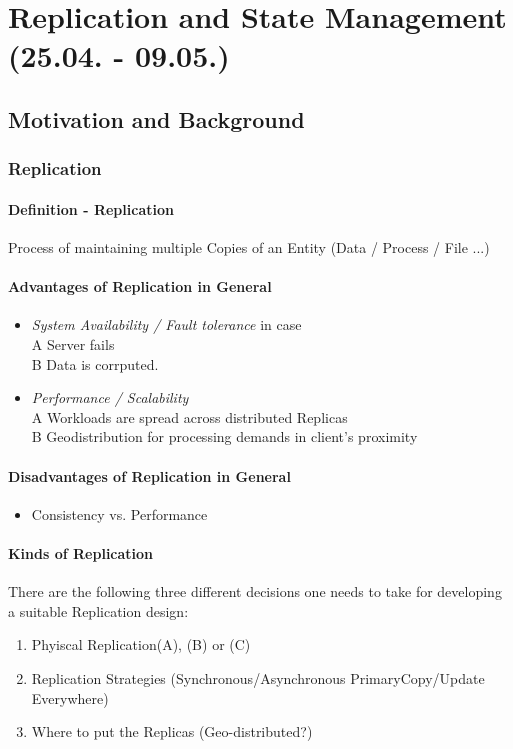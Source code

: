 \documentclass[a4paper,12pt]{article}%
\begin{document}
 \section{Replication and State Management\\ (25.04. - 09.05.)}


\subsection{Motivation and Background}

\subsubsection{Replication}
\paragraph{Definition - Replication}
Process of maintaining multiple Copies of an Entity (Data / Process / File ...)

\paragraph{Advantages of Replication in General}
\begin{itemize}
	\item {\it System Availability / Fault tolerance} in case \\
	A \quad Server fails \\
	B \quad Data is corrputed.
	\item {\it Performance / Scalability } \\
	A \quad Workloads are spread across distributed Replicas \\
	B \quad Geodistribution for processing demands in client's proximity
\end{itemize} 

\paragraph{Disadvantages of Replication in General}
\begin{itemize}
	\item Consistency vs. Performance
\end{itemize}
\paragraph{Kinds of Replication}
There are the following three different decisions one needs to take for developing a suitable Replication design:
\begin{enumerate}
 \item \glqq Phyiscal Replication\grqq (A), (B) or (C)
 \item Replication Strategies (Synchronous/Asynchronous PrimaryCopy/Update Everywhere)
 \item Where to put the Replicas (Geo-distributed?)
\end{enumerate}
\end{document}

